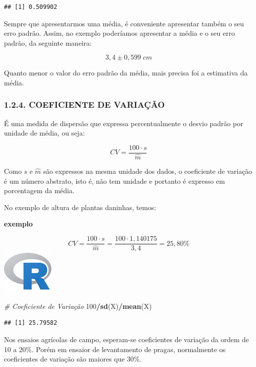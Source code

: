 \documentclass[
]{article}
\newenvironment{Shaded}{\begin{snugshade}}{\end{snugshade}}
\newcommand{\CommentTok}[1]{\textcolor[rgb]{0.56,0.35,0.01}{\textit{#1}}}
\newcommand{\DecValTok}[1]{\textcolor[rgb]{0.00,0.00,0.81}{#1}}
\newcommand{\KeywordTok}[1]{\textcolor[rgb]{0.13,0.29,0.53}{\textbf{#1}}}
\newcommand{\NormalTok}[1]{#1}
\newcommand{\OperatorTok}[1]{\textcolor[rgb]{0.81,0.36,0.00}{\textbf{#1}}}
\begin{document}
\begin{verbatim}
## [1] 0.509902
\end{verbatim}

Sempre que apresentarmos uma média, é conveniente apresentar também o
seu erro padrão. Assim, no exemplo poderíamos apresentar a média e o seu
erro padrão, da seguinte maneira:

\[
3,4 \pm 0,599\;cm
\]

Quanto menor o valor do erro padrão da média, mais precisa foi a
estimativa da média.

\hypertarget{coeficiente-de-variauxe7uxe3o}{%
\subsubsection{1.2.4. COEFICIENTE DE
VARIAÇÃO}\label{coeficiente-de-variauxe7uxe3o}}

É uma medida de dispersão que expressa percentualmente o desvio padrão
por unidade de média, ou seja:

\[
CV = \frac{100 \cdot s}{\hat{m}}
\]

Como \(s\) e \(\hat{m}\) são expressos na mesma unidade dos dados, o
coeficiente de variação é um número abstrato, isto é, não tem unidade e
portanto é expresso em porcentagem da média.

No exemplo de altura de plantas daninhas, temos:

\textbf{exemplo}

\[
CV = \frac{100 \cdot s}{\hat{m}} = \frac{100 \cdot 1,140175}{3,4} = 25,80\%
\] \includegraphics{R.png}

\begin{Shaded}
\begin{Highlighting}[]
\CommentTok{# Coeficiente de Variação}
\DecValTok{100}\OperatorTok{/}\KeywordTok{sd}\NormalTok{(X)}\OperatorTok{/}\KeywordTok{mean}\NormalTok{(X)}
\end{Highlighting}
\end{Shaded}

\begin{verbatim}
## [1] 25.79582
\end{verbatim}

Nos ensaios agrícolas de campo, esperam-se coeficientes de variação da
ordem de 10 a 20\%. Porém em ensaior de levantamento de pragas,
normalmente os coeficientes de variação são maiores que 30\%.
\end{document}
